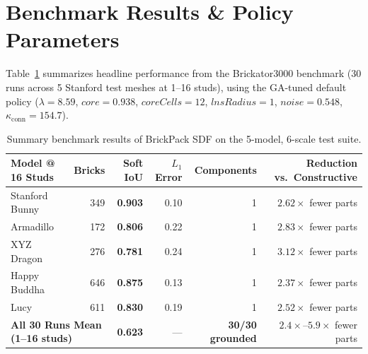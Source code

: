 \documentclass[11pt,twoside]{article}
\begin{document}
\section{Benchmark Results \& Policy Parameters}

Table~\ref{tab:bench} summarizes headline performance from the Brickator3000 benchmark (30 runs across 5 Stanford test meshes at 1--16 studs), using the GA-tuned default policy ($\lambda = 8.59$, $\textit{core} = 0.938$, $\textit{coreCells} = 12$, $\textit{lnsRadius} = 1$, $\textit{noise} = 0.548$, $\kappa_{\text{conn}} = 154.7$).

\begin{table}[ht]
\centering\footnotesize
\begin{tabular}{l r r r r r}
\toprule
Model @ 16 Studs & Bricks & Soft IoU & $L_1$ Error & Components & Reduction vs.\ Constructive \\
\midrule
Stanford Bunny & 349 & \textbf{0.903} & 0.10 & 1 & $2.62\times$ fewer parts \\
Armadillo      & 172 & \textbf{0.806} & 0.22 & 1 & $2.83\times$ fewer parts \\
XYZ Dragon     & 276 & \textbf{0.781} & 0.24 & 1 & $3.12\times$ fewer parts \\
Happy Buddha   & 646 & \textbf{0.875} & 0.13 & 1 & $2.37\times$ fewer parts \\
Lucy           & 611 & \textbf{0.830} & 0.19 & 1 & $2.52\times$ fewer parts \\
\midrule
\multicolumn{2}{l}{\textbf{All 30 Runs Mean (1--16 studs)}} & \textbf{0.623} & --- & \textbf{30/30 grounded} & $2.4\times$--$5.9\times$ fewer parts \\
\bottomrule
\end{tabular}
\caption{Summary benchmark results of BrickPack SDF on the 5-model, 6-scale test suite.}
\label{tab:bench}
\end{table}
\end{document}
